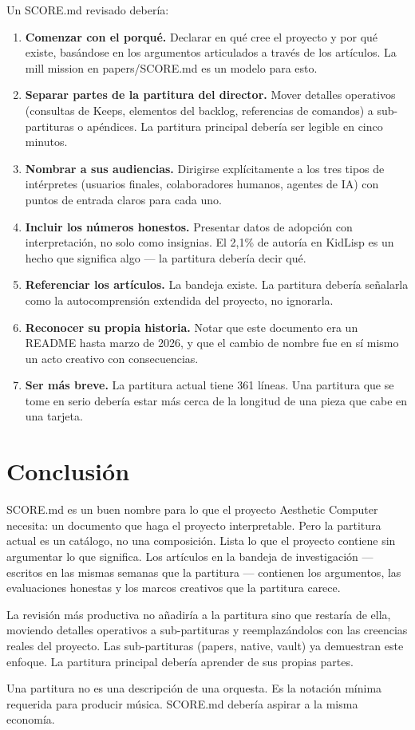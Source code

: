 \documentclass[10pt,letterpaper,twocolumn]{article}
\begin{document}
Un SCORE.md revisado deber\'ia:

\begin{enumerate}
\item \textbf{Comenzar con el porqu\'e.} Declarar en qu\'e cree el proyecto y por qu\'e existe, bas\'andose en los argumentos articulados a trav\'es de los art\'iculos. La mill mission en papers/SCORE.md es un modelo para esto.
\item \textbf{Separar partes de la partitura del director.} Mover detalles operativos (consultas de Keeps, elementos del backlog, referencias de comandos) a sub-partituras o ap\'endices. La partitura principal deber\'ia ser legible en cinco minutos.
\item \textbf{Nombrar a sus audiencias.} Dirigirse expl\'icitamente a los tres tipos de int\'erpretes (usuarios finales, colaboradores humanos, agentes de IA) con puntos de entrada claros para cada uno.
\item \textbf{Incluir los n\'umeros honestos.} Presentar datos de adopci\'on con interpretaci\'on, no solo como insignias. El 2,1\% de autor\'ia en KidLisp es un hecho que significa algo --- la partitura deber\'ia decir qu\'e.
\item \textbf{Referenciar los art\'iculos.} La bandeja existe. La partitura deber\'ia se\~nalarla como la autocomprensi\'on extendida del proyecto, no ignorarla.
\item \textbf{Reconocer su propia historia.} Notar que este documento era un README hasta marzo de 2026, y que el cambio de nombre fue en s\'i mismo un acto creativo con consecuencias.
\item \textbf{Ser m\'as breve.} La partitura actual tiene 361 l\'ineas. Una partitura que se tome en serio deber\'ia estar m\'as cerca de la longitud de una pieza que cabe en una tarjeta.
\end{enumerate}

\section{Conclusi\'on}

SCORE.md es un buen nombre para lo que el proyecto Aesthetic Computer necesita: un documento que haga el proyecto interpretable. Pero la partitura actual es un cat\'alogo, no una composici\'on. Lista lo que el proyecto contiene sin argumentar lo que significa. Los art\'iculos en la bandeja de investigaci\'on --- escritos en las mismas semanas que la partitura --- contienen los argumentos, las evaluaciones honestas y los marcos creativos que la partitura carece.

La revisi\'on m\'as productiva no a\~nadir\'ia a la partitura sino que restar\'ia de ella, moviendo detalles operativos a sub-partituras y reemplaz\'andolos con las creencias reales del proyecto. Las sub-partituras (papers, native, vault) ya demuestran este enfoque. La partitura principal deber\'ia aprender de sus propias partes.

Una partitura no es una descripci\'on de una orquesta. Es la notaci\'on m\'inima requerida para producir m\'usica. SCORE.md deber\'ia aspirar a la misma econom\'ia.



\end{document}
